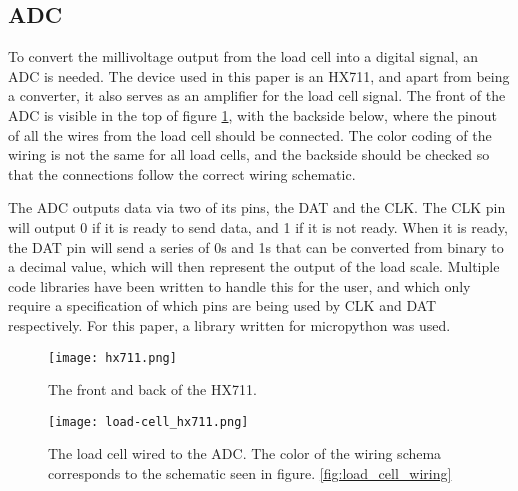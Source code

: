 \subsection{ADC}
To convert the millivoltage output from the load cell into a digital signal, an ADC is needed. The device used in this paper is an HX711, and apart from being a converter, it also serves as an amplifier for the load cell signal. The front of the ADC is visible in the top of figure \ref{fig:hx711}, with the backside below, where the pinout of all the wires from the load cell should be connected. The color coding of the wiring is not the same for all load cells, and the backside should be checked so that the connections follow the correct wiring schematic. 

The ADC outputs data via two of its pins, the DAT and the CLK. The CLK pin will output 0 if it is ready to send data, and 1 if it is not ready. When it is ready, the DAT pin will send  a series of 0s and 1s that can be converted from binary to a decimal value, which will then represent the output of the load scale.\cite{hx711-datasheet} Multiple code libraries have been written to handle this for the user, and which only require a specification of which pins are being used by CLK and DAT respectively. For this paper, a library written for micropython was used.\cite{hx711-lopy}

\begin{figure}[h]
	\centering
	\texttt{[image: hx711.png]}
	\caption{The front and back of the HX711.}
	\label{fig:hx711}
\end{figure}

\begin{figure}[h]
	\centering
	\texttt{[image: load-cell\_hx711.png]}
	\caption{The load cell wired to the ADC. The color of the wiring schema corresponds to the schematic seen in figure. \ref{fig:load_cell_wiring}}
	\label{fig:load_cell_hx711}
\end{figure}

